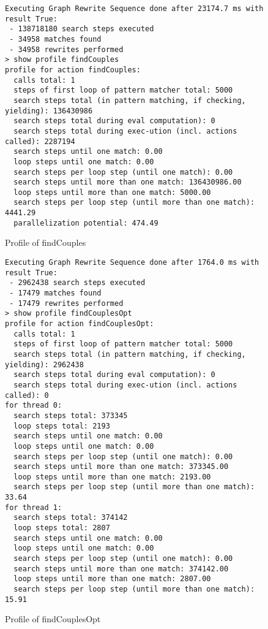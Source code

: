 \begin{figure}[hptb]
	\begin{verbatim}
Executing Graph Rewrite Sequence done after 23174.7 ms with result True:
 - 138718180 search steps executed
 - 34958 matches found
 - 34958 rewrites performed
> show profile findCouples
profile for action findCouples:
  calls total: 1
  steps of first loop of pattern matcher total: 5000
  search steps total (in pattern matching, if checking, yielding): 136430986
  search steps total during eval computation): 0
  search steps total during exec-ution (incl. actions called): 2287194
  search steps until one match: 0.00
  loop steps until one match: 0.00
  search steps per loop step (until one match): 0.00
  search steps until more than one match: 136430986.00
  loop steps until more than one match: 5000.00
  search steps per loop step (until more than one match): 4441.29
  parallelization potential: 474.49
  \end{verbatim}
	\caption{Profile of findCouples}
	\label{fig:profilefindCouples}
\end{figure}

\begin{figure}[hptb]
	\begin{verbatim}
Executing Graph Rewrite Sequence done after 1764.0 ms with result True:
 - 2962438 search steps executed
 - 17479 matches found
 - 17479 rewrites performed
> show profile findCouplesOpt
profile for action findCouplesOpt:
  calls total: 1
  steps of first loop of pattern matcher total: 5000
  search steps total (in pattern matching, if checking, yielding): 2962438
  search steps total during eval computation): 0
  search steps total during exec-ution (incl. actions called): 0
for thread 0:
  search steps total: 373345
  loop steps total: 2193
  search steps until one match: 0.00
  loop steps until one match: 0.00
  search steps per loop step (until one match): 0.00
  search steps until more than one match: 373345.00
  loop steps until more than one match: 2193.00
  search steps per loop step (until more than one match): 33.64
for thread 1:
  search steps total: 374142
  loop steps total: 2807
  search steps until one match: 0.00
  loop steps until one match: 0.00
  search steps per loop step (until one match): 0.00
  search steps until more than one match: 374142.00
  loop steps until more than one match: 2807.00
  search steps per loop step (until more than one match): 15.91
  \end{verbatim}
	\caption{Profile of findCouplesOpt}
	\label{fig:profilefindCouplesOpt}
\end{figure}

